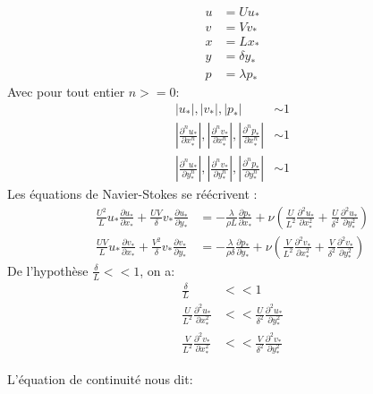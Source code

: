 \documentclass[french]{article}
\begin{document}
\begin{align*}
	u &= Uu_{*}\\
	v &= Vv_{*}\\
	x &= Lx_{*}\\
	y &= \delta y_{*}\\
	p &= \lambda p_{*}
\end{align*}
Avec pour tout entier  $n >= 0$:
\begin{align*}
	\left| u_{*} \right |,
	\left| v_{*} \right |,
	\left| p_{*} \right | 
	&\sim 1\\
	\left |\frac{\partial^{n} u_{*}}{\partial x_{*}^{n}} \right |,
	\left |\frac{\partial^{n} v_{*}}{\partial x_{*}^{n}} \right |,
	\left |\frac{\partial^{n} p_{*}}{\partial x_{*}^{n}} \right |
	&\sim 1\\
	\left |\frac{\partial^{n} u_{*}}{\partial y_{*}^{n}} \right |,
	\left |\frac{\partial^{n} v_{*}}{\partial y_{*}^{n}} \right |,
	\left |\frac{\partial^{n} p_{*}}{\partial y_{*}^{n}} \right |
	&\sim 1
\end{align*}
Les équations de Navier-Stokes se réécrivent :
\begin{align*}
	\frac{U^{2}}{L}
	u_{*}
	\frac{\partial u_{*}}{\partial x_{*}} + 
	\frac{UV}{\delta}
	v_{*}
	\frac{\partial u_{*}}{\partial y_{*}} 
	&= - \frac{\lambda}{\rho L}
	\frac{\partial p_{*}}{\partial  x_{*}} +
	\nu 
	\left(
	\frac{U}{L^{2}}
	\frac{\partial^{2} u_{*}}{\partial  x_{*}^{2}} + 
	\frac{U}{\delta ^ {2}}
	\frac{\partial^{2} u_{*}}{\partial  y_{*}^{2}}
	\right) \\
	\frac{UV}{L}
	u_{*}
	\frac{\partial v_{*}}{\partial x_{*}} + 
	\frac{V^{2}}{\delta}
	v_{*}
	\frac{\partial v_{*}}{\partial y_{*}} 
	&= 
	- \frac{\lambda}{\rho\delta}
	\frac{\partial p_{*}}{\partial  y_{*}} +
	\nu
	\left(
	\frac{V}{L^{2}}
	\frac{\partial^{2} v_{*}}{\partial  x_{*}^{2}} + 
	\frac{V}{\delta^{2}}
	\frac{\partial^{2} v_{*}}{\partial  y_{*}^{2}}
	\right) 
\end{align*}
De l'hypothèse $\frac{\delta}{L} << 1 $, on a:
\begin{align*}
	\frac{\delta}{L} &<< 1\\
	\frac{U}{L^{2}}\frac{\partial^{2} u_{*}}{\partial  x_{*}^{2}} 
	&<<
	\frac{U}{\delta ^ {2}}
	\frac{\partial^{2} u_{*}}{\partial  y_{*}^{2}} \\
	\frac{V}{L^{2}}
	\frac{\partial^{2} v_{*}}{\partial  x_{*}^{2}} 
	&<<
	\frac{V}{\delta^{2}}
	\frac{\partial^{2} v_{*}}{\partial  y_{*}^{2}}
\end{align*}

L'équation de continuité nous dit:
\end{document}
